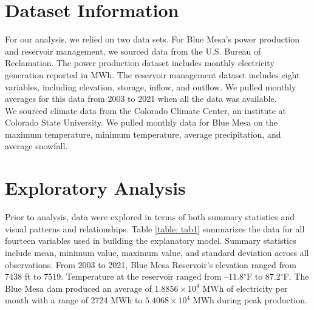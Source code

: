 \documentclass[
  12pt,
]{article}
\begin{document}
\newpage

\hypertarget{dataset-information}{%
\section{Dataset Information}\label{dataset-information}}

For our analysis, we relied on two data sets. For Blue Mesa's power
production and reservoir management, we sourced data from the U.S.
Bureau of Reclamation. The power production dataset includes monthly
electricity generation reported in MWh. The reservoir management dataset
includes eight variables, including elevation, storage, inflow, and
outflow. We pulled monthly averages for this data from 2003 to 2021 when
all the data was available.\\

We sourced climate data from the Colorado Climate Center, an institute
at Colorado State University. We pulled monthly data for Blue Mesa on
the maximum temperature, minimum temperature, average precipitation, and
average snowfall.

\newpage

\hypertarget{exploratory-analysis}{%
\section{Exploratory Analysis}\label{exploratory-analysis}}

Prior to analysis, data were explored in terms of both summary
statistics and visual patterns and relationships. Table
\ref{table: tab1} summarizes the data for all fourteen variables used in
building the explanatory model. Summary statistics include mean, minimum
value, maximum value, and standard deviation across all observations.
From 2003 to 2021, Blue Mesa Reservoir's elevation ranged from 7438 ft
to 7519. Temperature at the reservoir ranged from --11.8\(^\circ\)F to
87.2\(^\circ\)F. The Blue Mesa dam produced an average of
\ensuremath{1.8856\times 10^{4}} MWh of electricity per month with a
range of 2724 MWh to \ensuremath{5.4068\times 10^{4}} MWh during peak
production.
\end{document}
